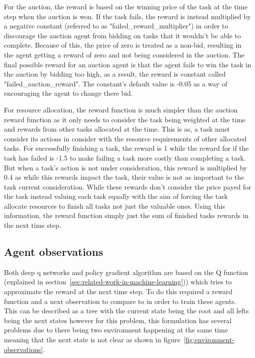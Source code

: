 For the auction, the reward is based on the winning price of the task at the time step when the auction is won. If the
task fails, the reward is instead multiplied by a negative constant (referred to as "failed\_reward\_multiplier") in
order to discourage the auction agent from bidding on tasks that it wouldn't be able to complete. Because of this,
the price of zero is treated as a non-bid, resulting in the agent getting a reward of zero and not being considered in
the auction. The final possible reward for an auction agent is that the agent fails to win the task in the auction by
bidding too high, as a result, the reward is constant called "failed\_auction\_reward". The constant's default value is
-0.05 as a way of encouraging the agent to change there bid.

For resource allocation, the reward function is much simpler than the auction reward function as it only needs to
consider the task being weighted at the time and rewards from other tasks allocated at the time. This is as,
a task must consider its actions in consider with the resource requirements of other allocated tasks. For successfully
finishing a task, the reward is 1 while the reward for if the task has failed is -1.5 to make failing a task more
costly than completing a task. But when a task's action is not under consideration, this reward is multiplied by
0.4 as while this rewards impact the task, their value is not as important to the task current consideration.
While these rewards don't consider the price payed for the task instead valuing each task equally with the aim of
forcing the task allocate resources to finish all tasks not just the valuable ones. Using this information, the reward
function simply just the sum of finished tasks rewards in the next time step.

\subsection{Agent observations}\label{subsec:agent-observations}
Both deep q networks and policy gradient algorithm are based on the Q function (explained in
section~\ref{sec:related-work-in-machine-learning})) which tries to approximate the reward at the next time step. To do
this required a reward function and a next observation to compare to in order to train these agents. This can be
described as a tree with the current state being the root and all lefts being the next states however for this problem,
this formulation has several problems due to there being two environment happening at the same time meaning that the
next state is not clear as shown in figure~\ref{fig:environment-observations}.

